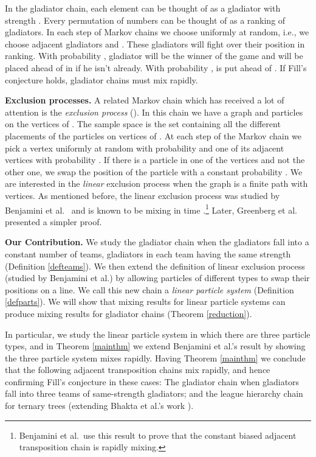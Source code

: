 \documentclass[10 pt]{article}
\begin{document}
In the gladiator chain, each element  can be thought of as a gladiator with strength . Every permutation of numbers 
can be thought of as a ranking of gladiators. In each step of Markov chains we choose  uniformly at random, i.e., we choose
adjacent gladiators  and . These gladiators will fight over their position in ranking. With probability
, gladiator  will be the winner of the game and will be placed ahead of  in  if he isn't already.
With probability ,  is put ahead of .  If Fill's conjecture holds, gladiator chains must mix rapidly. 
 \medskip
 
 
 
\textbf{Exclusion processes.} A related Markov chain which has received a lot of attention is the \emph{exclusion process} (\cite{exc1, exc2}).
In this chain we have a graph    and   particles  on the vertices of . The sample space is the
set containing all the different placements of the  particles on vertices of . At each step of the Markov chain we pick a vertex 
uniformly at random with probability   and  one of its adjacent vertices  with probability  . If there is a
particle in one of the vertices and not the other one, we swap the position of the particle with a constant probability . We are interested
in the \emph{linear} exclusion process when the graph is a finite path with  vertices.  As mentioned before, the linear exclusion process
was studied by Benjamini et al.\ \cite{Benjamini} and is known to be mixing in time .\footnote{Benjamini et al.\ use this
result to prove that the constant biased adjacent transposition chain is rapidly mixing.} Later, Greenberg et al.\ \cite{Greenberg}
presented a simpler proof. 

 \medskip
\textbf{Our Contribution.}
We study the gladiator chain when the gladiators fall into a constant number of teams, gladiators in each team having the same strength
(Definition \ref{defteams}).  We then extend the definition of linear exclusion process (studied by Benjamini et al.) by allowing particles
of different types to swap their positions on a line. We call this new chain a \emph{linear particle system} (Definition \ref{defparts}).
We will show that mixing results for linear particle systems can produce mixing results for gladiator chains (Theorem \ref{reduction}). 

In particular, we study the linear particle system in which there are three particle types, and in Theorem \ref{mainthm} we extend
Benjamini et al.'s result by  showing the three particle system mixes rapidly. Having Theorem \ref{mainthm} we conclude that the
following adjacent transposition chains mix rapidly, and hence confirming Fill's conjecture in these cases: The gladiator chain
when gladiators fall into three teams of same-strength gladiators; and the league hierarchy chain for ternary trees
(extending Bhakta et al.'s work \cite{Dana}). 
\medskip
\end{document}
